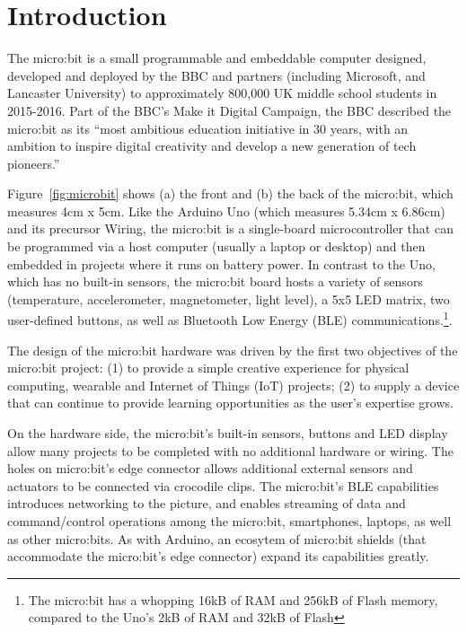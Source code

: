 \section{Introduction}
\label{sec:intrp}


The micro:bit is a small programmable and embeddable computer designed, 
developed and deployed by the BBC and partners (including Microsoft, 
and Lancaster University) to approximately 800,000 UK middle school students
in 2015-2016. Part of the BBC's Make it Digital Campaign, the BBC described the
micro:bit as its ``most ambitious education initiative in 30 years, 
with an ambition to inspire digital creativity and 
develop a new generation of tech pioneers.''~\cite{BBCwebsite}


Figure~\ref{fig:microbit} shows (a) the front and (b) the back of the
micro:bit, which measures 4cm x 5cm. Like the Arduino Uno 
(which measures 5.34cm x 6.86cm) and its
precursor Wiring, the micro:bit is a single-board microcontroller 
that can be programmed via a host computer (usually a laptop or desktop)
and then embedded in projects where it runs on battery power.
In contrast to the Uno, which has no built-in sensors, the micro:bit 
board hosts a variety of sensors (temperature, accelerometer, magnetometer, light level), 
a 5x5 LED matrix, two user-defined buttons, as well as Bluetooth
Low Energy (BLE) communications.\footnote{The micro:bit has a whopping
16kB of RAM and 256kB of Flash memory, compared to the Uno's 2kB of 
RAM and 32kB of Flash}.

The design of the micro:bit hardware was driven by the
first two objectives of the micro:bit project:
(1) to provide a simple creative experience for physical computing, wearable and Internet of Things (IoT) projects;
(2) to supply a device that can continue to provide learning opportunities as the user's expertise grows.

On the hardware side, the micro:bit's built-in sensors, buttons and LED display 
allow many projects to be completed with no additional hardware or wiring. 
The holes on micro:bit's edge
connector allows additional external sensors and actuators to be connected via crocodile clips.
The micro:bit's BLE capabilities introduces networking to the
picture, and enables streaming of data and command/control operations among the micro:bit, 
smartphones, laptops, as well as other micro:bits.
As with Arduino, an ecosytem of micro:bit shields (that accommodate the micro:bit's edge
connector) expand its capabilities greatly. 

